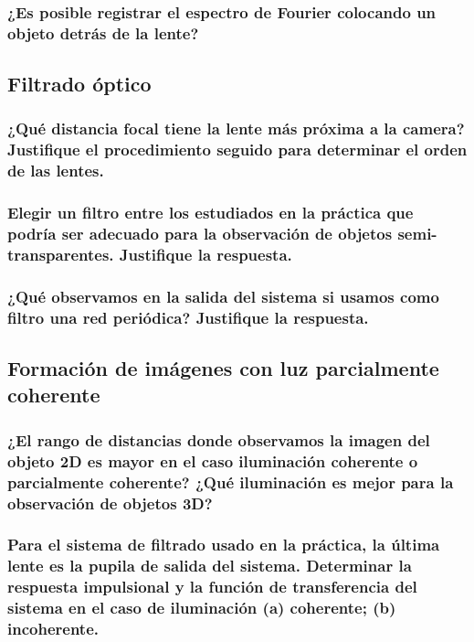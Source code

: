 \documentclass{./packages/optica-article}
\begin{document}
\subsubsection{¿Es posible registrar el espectro de Fourier colocando un objeto detrás de la lente?}



\subsection{Filtrado óptico}
\subsubsection{¿Qué distancia focal tiene la lente más próxima a la camera? Justifique el procedimiento seguido para determinar el orden de las lentes.}
\subsubsection{Elegir un filtro entre los estudiados en la práctica que podría ser adecuado para la observación de objetos semi-transparentes. Justifique la respuesta.}
\subsubsection{¿Qué observamos en la salida del sistema si usamos como filtro una red periódica? Justifique la respuesta.}

\subsection{Formación de imágenes con luz parcialmente coherente}

\subsubsection{¿El rango de distancias donde observamos la imagen del objeto 2D es mayor en el caso iluminación coherente o parcialmente coherente? ¿Qué iluminación es mejor para la observación de objetos 3D?}

\subsubsection{Para el sistema de filtrado usado en la práctica, la última lente es la pupila de salida del sistema. Determinar la respuesta impulsional y la función de transferencia del sistema en el caso de iluminación (a) coherente; (b) incoherente.}

\end{document}
